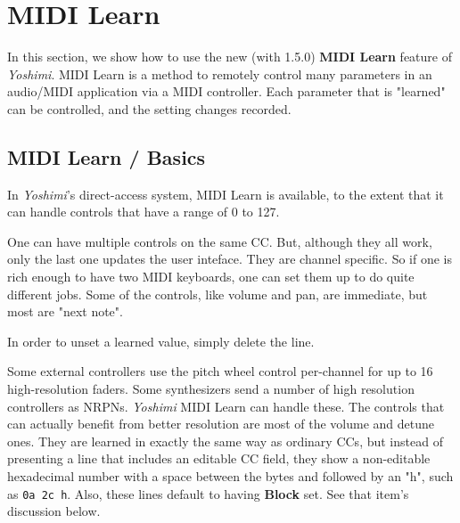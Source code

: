 %
%
%

\section{MIDI Learn}
\label{sec:midi_learn}

   In this section, we show how to use the new (with 1.5.0)
   \textbf{MIDI Learn} feature of \textsl{Yoshimi}.
   MIDI Learn is a method to remotely control many parameters in an audio/MIDI
   application via a MIDI controller.  Each parameter that is "learned" can be
   controlled, and the setting changes recorded.

\subsection{MIDI Learn / Basics}
\label{subsec:midi_learn_basics}

   In \textsl{Yoshimi}'s direct-access system, MIDI Learn is available, to
   the extent that it can handle controls that have a range of 0 to 127.

   One can have multiple controls on the same CC.  But, although they all work,
   only the last one updates the user inteface.  They are channel specific. So
   if one is rich enough to have two MIDI keyboards, one can set them up to do
   quite different jobs.
   Some of the controls, like volume and pan, are immediate, but most are "next
   note".

   In order to unset a learned value, simply delete the line.

   Some external controllers use the pitch wheel control per-channel for up to 16
   high-resolution faders.
   Some synthesizers send a number of high resolution controllers as NRPNs.
   \textsl{Yoshimi} MIDI Learn can handle these.
   The controls that can actually benefit from better resolution are
   most of the volume and detune ones.
   They are learned in exactly the same way as ordinary CCs, but instead of
   presenting a line that includes an editable CC field, they show a non-editable
   hexadecimal number with a space between the bytes and followed by an "h",
   such as \texttt{0a 2c h}.
   Also, these lines default to having \textbf{Block} set.
   See that item's discussion below.


